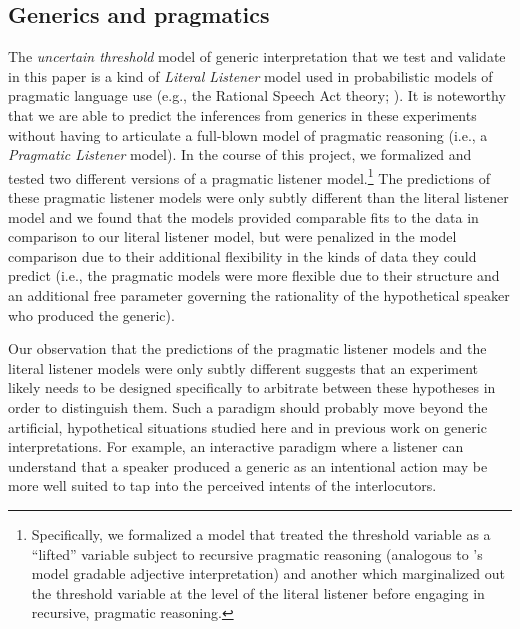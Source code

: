 \documentclass[floatsintext,doc]{apa6}
\let\rmarkdownfootnote\footnote%
\def\footnote{\protect\rmarkdownfootnote}
\begin{document}
\subsection{Generics and pragmatics}

The \emph{uncertain threshold} model of generic interpretation that we test and validate in this paper is a kind of \emph{Literal Listener} model used in probabilistic models of pragmatic language use (e.g., the Rational Speech Act theory; ). 
It is noteworthy that we are able to predict the inferences from generics in these experiments without having to articulate a full-blown model of pragmatic reasoning (i.e., a \emph{Pragmatic Listener} model). 
In the course of this project, we formalized and tested two different versions of a pragmatic listener model.\footnote{Specifically, we formalized a model that treated the threshold variable as a ``lifted'' variable subject to recursive pragmatic reasoning (analogous to 's model gradable adjective interpretation) and another which marginalized out the threshold variable at the level of the literal listener before engaging in recursive, pragmatic reasoning.}
The predictions of these pragmatic listener models were only subtly different than the literal listener model and we found that the models provided comparable fits to the data in comparison to our literal listener model, but were penalized in the model comparison due to their additional flexibility in the kinds of data they could predict (i.e., the pragmatic models were more flexible due to their structure and an additional free parameter governing the rationality of the hypothetical speaker who produced the generic). 

Our observation that the predictions of the pragmatic listener models and the literal listener models were only subtly different suggests that an experiment likely needs to be designed specifically to arbitrate between these hypotheses in order to distinguish them.
Such a paradigm should probably move beyond the artificial, hypothetical situations studied here and in previous work on generic interpretations. 
For example, an interactive paradigm where a listener can understand that a speaker produced a generic as an intentional action may be more well suited to tap into the perceived intents of the interlocutors. 



\end{document}
